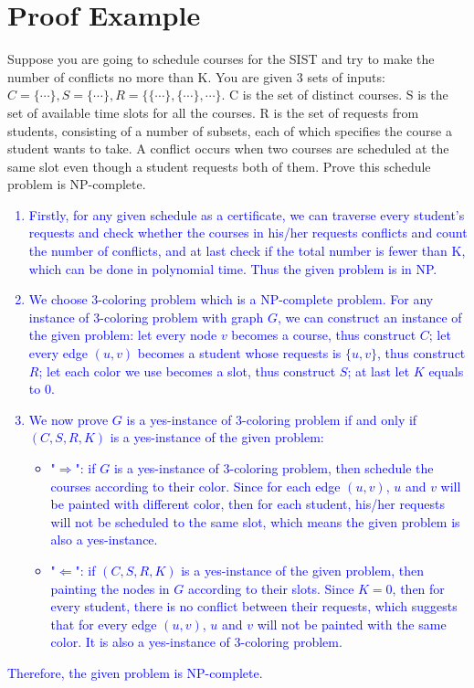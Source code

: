 \documentclass{article}
\begin{document}
\section*{Proof Example}
Suppose you are going to schedule courses for the SIST and try to make the number of conflicts no more than K. You are given 3 sets of inputs: $C=\{\cdots\},S=\{\cdots\},R=\{\{\cdots\},\{\cdots\},\cdots\}$. C is the set of distinct courses. S is the set of available time slots for all the courses. R is the set of requests from students, consisting of a number of subsets, each of which specifies the course a student wants to take. A conflict occurs when two courses are scheduled at the same slot even though a student requests both of them. Prove this schedule problem is NP-complete.\\
\textcolor{blue}{
	\begin{enumerate}
		\item Firstly, for any given schedule as a certificate, we can traverse every student's requests and check whether the courses in his/her requests conflicts and count the number of conflicts, and at last check if the total number is fewer than K, which can be done in polynomial time. Thus the given problem is in NP.
		\item We choose 3-coloring problem which is a NP-complete problem. For any instance of 3-coloring problem with graph $G$, we can construct an instance of the given problem: let every node $v$ becomes a course, thus construct $C$; let every edge $(u,v)$ becomes a student whose requests is $\{u,v\}$, thus construct $R$; let each color we use becomes a slot, thus construct $S$; at last let $K$ equals to $0$.
		\item We now prove $G$ is a yes-instance of 3-coloring problem if and only if $(C,S,R,K)$ is a yes-instance of
		      the given problem:
		      \begin{itemize}
			      \item "$\Rightarrow$": if $G$ is a yes-instance of 3-coloring problem, then schedule the courses according to their color. Since for each edge $(u,v)$, $u$ and $v$ will be painted with different color, then for each student, his/her requests will not be scheduled to the same slot, which means the given problem is also a yes-instance.
			      \item "$\Leftarrow$": if $(C,S,R,K)$ is a yes-instance of the given problem, then painting the nodes in $G$ according to their slots. Since $K=0$, then for every student, there is no conflict between their requests, which suggests that for every edge $(u,v)$, $u$ and $v$ will not be painted with the same color. It is also a yes-instance of 3-coloring problem.
		      \end{itemize}
	\end{enumerate}
	Therefore, the given problem is NP-complete.
}
\newpage
\end{document}

